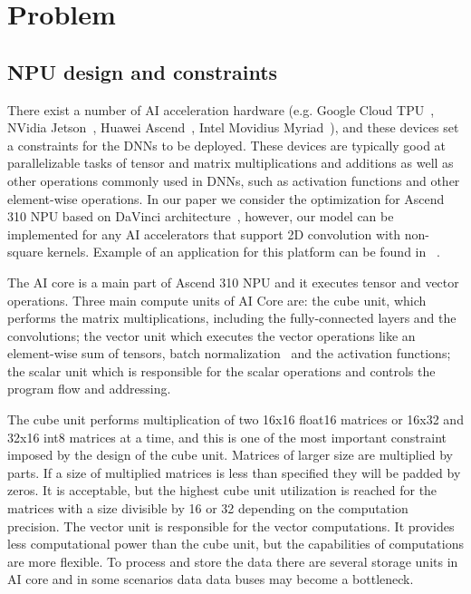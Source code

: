 \documentclass[letterpaper]{article}
\begin{document}
\section{Problem} \label{problem}

\subsection{NPU design and constraints}
There exist a number of AI acceleration hardware (e.g. Google Cloud TPU~\cite{tpu2019edge, 10.1145/3154484}, NVidia Jetson~\cite{nvidiajetson}, Huawei Ascend~\cite{huawei2021ascend310}, Intel Movidius Myriad~\cite{intelmovidiusmyriad}), and these devices set a constraints for the DNNs to be deployed.
These devices are typically good at parallelizable tasks of tensor and matrix multiplications and additions as well as other operations commonly used in DNNs, such as activation functions and other element-wise operations.
In our paper we consider the optimization for Ascend 310 NPU based on DaVinci architecture~\cite{huawei2020davinci}, 
however, our model can be implemented for any AI accelerators that support 2D convolution with non-square kernels. Example of an application for this platform can be found in ~\cite{taskynov2021tensor}.

The AI core is a main part of Ascend 310 NPU and it executes tensor and vector operations.
Three main compute units of AI Core are: the cube unit, which performs the matrix multiplications, including the fully-connected layers and the convolutions;
the vector unit which executes the vector operations like an element-wise sum of tensors, batch normalization~\cite{batchnorm} and the activation functions;
the scalar unit which is responsible for the scalar operations and controls the program flow and addressing.

The cube unit performs multiplication of two 16x16 float16 matrices or 16x32 and 32x16 int8 matrices at a time, and this is one of the most important constraint imposed by the design of the cube unit.
Matrices of larger size are multiplied by parts.
If a size of multiplied matrices is less than specified they will be padded by zeros.
It is acceptable, but the highest cube unit utilization is reached for the matrices with a size divisible by 16 or 32 depending on the computation precision.
The vector unit is responsible for the vector computations.
It provides less computational power than the cube unit, but the capabilities of computations are more flexible.
To process and store the data there are several storage units in AI core and in some scenarios data data buses may become a bottleneck.
\end{document}
